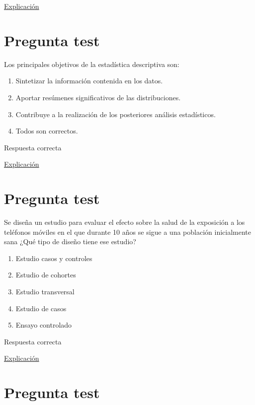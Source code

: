 \documentclass[
]{book}
\providecommand{\tightlist}{%
  \setlength{\itemsep}{0pt}\setlength{\parskip}{0pt}}
\begin{document}
\href{https://1fjmanzano.github.io/bioestadistica/conceptos-previos.html}{Explicación}

\hypertarget{pregunta-test-38}{%
\section{Pregunta test}\label{pregunta-test-38}}

Los principales objetivos de la estadística descriptiva son:

\begin{enumerate}
\def\labelenumi{\alph{enumi})}
\tightlist
\item
  Sintetizar la información contenida en los datos.
\item
  Aportar resúmenes significativos de las distribuciones.
\item
  Contribuye a la realización de los posteriores análisis estadísticos.
\item
  Todos son correctos.
\end{enumerate}

Respuesta correcta

\href{https://1fjmanzano.github.io/bioestadistica/an\%C3\%A1lisis-exploratorio-de-datos.html}{Explicación}

\hypertarget{pregunta-test-39}{%
\section{Pregunta test}\label{pregunta-test-39}}

Se diseña un estudio para evaluar el efecto sobre la salud de la exposición a los teléfonos móviles en el que durante 10 años se sigue a una población inicialmente sana ¿Qué tipo de diseño tiene ese estudio?

\begin{enumerate}
\def\labelenumi{\alph{enumi})}
\tightlist
\item
  Estudio casos y controles
\item
  Estudio de cohortes
\item
  Estudio transversal
\item
  Estudio de casos
\item
  Ensayo controlado
\end{enumerate}

Respuesta correcta

\href{https://es.wikipedia.org/wiki/Estudio_de_cohorte}{Explicación}

\hypertarget{pregunta-test-40}{%
\section{Pregunta test}\label{pregunta-test-40}}
\end{document}

